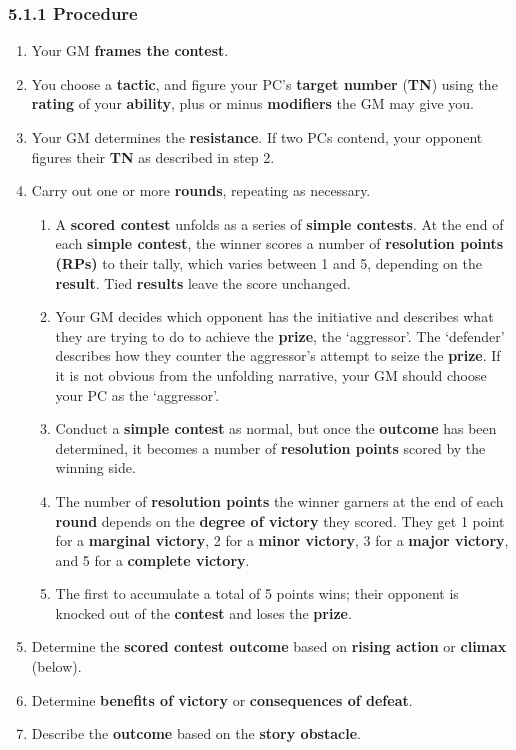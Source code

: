 \documentclass[
]{article}
\providecommand{\tightlist}{%
  \setlength{\itemsep}{0pt}\setlength{\parskip}{0pt}}
\begin{document}
\hypertarget{procedure-3}{%
\subsubsection{5.1.1 Procedure}\label{procedure-3}}

\begin{enumerate}
\def\labelenumi{\arabic{enumi}.}
\tightlist
\item
  Your GM \textbf{frames the contest}.
\item
  You choose a \textbf{tactic}, and figure your PC's \textbf{target
  number} (\textbf{TN}) using the \textbf{rating} of your
  \textbf{ability}, plus or minus \textbf{modifiers} the GM may give
  you.
\item
  Your GM determines the \textbf{resistance}. If two PCs contend, your
  opponent figures their \textbf{TN} as described in step 2.
\item
  Carry out one or more \textbf{rounds}, repeating as necessary.

  \begin{enumerate}
  \def\labelenumii{\arabic{enumii}.}
  \tightlist
  \item
    A \textbf{scored contest} unfolds as a series of \textbf{simple
    contests}. At the end of each \textbf{simple contest}, the winner
    scores a number of \textbf{resolution points (RPs)} to their tally,
    which varies between 1 and 5, depending on the \textbf{result}. Tied
    \textbf{results} leave the score unchanged.
  \item
    Your GM decides which opponent has the initiative and describes what
    they are trying to do to achieve the \textbf{prize}, the
    `aggressor'. The `defender' describes how they counter the
    aggressor's attempt to seize the \textbf{prize}. If it is not
    obvious from the unfolding narrative, your GM should choose your PC
    as the `aggressor'.
  \item
    Conduct a \textbf{simple contest} as normal, but once the
    \textbf{outcome} has been determined, it becomes a number of
    \textbf{resolution points} scored by the winning side.
  \item
    The number of \textbf{resolution points} the winner garners at the
    end of each \textbf{round} depends on the \textbf{degree of victory}
    they scored. They get 1 point for a \textbf{marginal victory}, 2 for
    a \textbf{minor victory}, 3 for a \textbf{major victory}, and 5 for
    a \textbf{complete victory}.
  \item
    The first to accumulate a total of 5 points wins; their opponent is
    knocked out of the \textbf{contest} and loses the \textbf{prize}.
  \end{enumerate}
\item
  Determine the \textbf{scored contest outcome} based on \textbf{rising
  action} or \textbf{climax} (below).
\item
  Determine \textbf{benefits of victory} or \textbf{consequences of
  defeat}.
\item
  Describe the \textbf{outcome} based on the \textbf{story obstacle}.
\end{enumerate}
\end{document}

